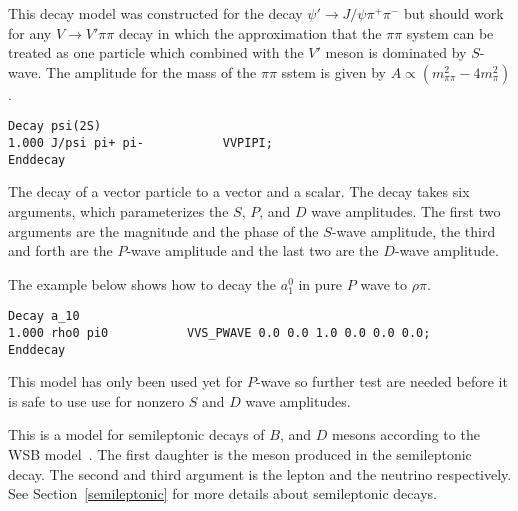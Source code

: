 
\label{vvpipi}



\Expl
This decay model was constructed for the decay 
$\psi'\rightarrow J/\psi \pi^+\pi^-$ but should work
for any $V\rightarrow V' \pi\pi$ decay in which the
approximation that the $\pi\pi$ system can be treated
as one particle which combined with the $V'$ meson
is dominated by $S$-wave. The amplitude for the
mass of the $\pi\pi$ sstem is given by 
$A\propto (m^2_{\pi\pi}-4m^{2}_{\pi})$.

\Example
\begin{verbatim}
Decay psi(2S)
1.000 J/psi pi+ pi-           VVPIPI;
Enddecay
\end{verbatim}







\label{vvspwave}



\Expl
The decay of a vector particle to a vector and a scalar. The decay
takes six arguments, which parameterizes the $S$, $P$, and $D$
wave amplitudes. The first two arguments are the magnitude 
and the phase of the $S$-wave amplitude, the third and forth
are the $P$-wave amplitude and the last two are the $D$-wave
amplitude. 

\Example
The example below shows how to decay the $a_1^0$ in pure 
$P$ wave to $\rho\pi$.
\begin{verbatim}
Decay a_10
1.000 rho0 pi0           VVS_PWAVE 0.0 0.0 1.0 0.0 0.0 0.0;
Enddecay
\end{verbatim}

\Notes
This model has only been used yet for $P$-wave so
further test are needed before it is safe to use use
for nonzero $S$ and $D$ wave amplitudes.






\label{wsb}



\Expl
This is a model for semileptonic decays of $B$, and $D$ mesons 
according to the WSB model~\cite{Wirbel85}. The first daughter
is the meson produced in the semileptonic decay. The second and third
argument is the lepton and the neutrino respectively.
See Section~\ref{semileptonic} for more details about semileptonic
decays.


